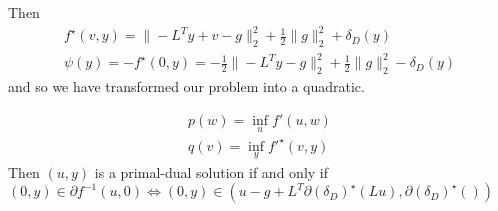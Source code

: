 \begin{exercises}
  Then
  \begin{align}
    \label{eq:39}
    f^{\star}(v, y) = \| -L^{T} y + v - g \|_{2}^{2} + \frac{1}{2} \|
    g \|_{2}^{2} + \delta_{D}(y) \\
    \psi(y) = -f^{\star}(0, y) = - \frac{1}{2} \| - L^{T} y - g
    \|_{2}^{2} + \frac{1}{2} \| g \|_{2}^{2} - \delta_{D}(y)
  \end{align} and so we have transformed our problem into a quadratic.

  \begin{align}
    \label{eq:40}
    p(w) = \inf_{u} f'(u, w) \\
    q(v) = \inf_{y} f'^{\star}(v, y)
  \end{align}
  Then $(u, y)$ is a primal-dual solution if and only if $(0, y)
  \in \partial f^{-1}(u, 0) \iff (0, y) \in (u - g + L^{T} \partial
  (\delta_{D})^{\star}(Lu), \partial (\delta_{D})^{\star}())$
\end{exercises}

